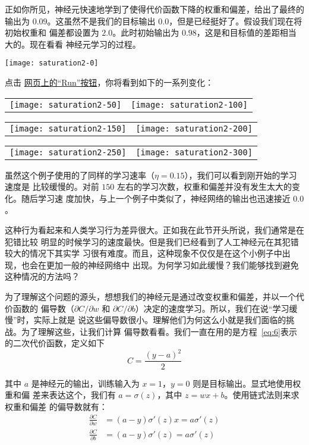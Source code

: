 正如你所见，神经元快速地学到了使得代价函数下降的权重和偏差，给出了最终的输出为
$0.09$。这虽然不是我们的目标输出 $0.0$，但是已经挺好了。假设我们现在将初始权重和
偏差都设置为 $2.0$。此时初始输出为 $0.98$，这是和目标值的差距相当大的。现在看看
神经元学习的过程。
\begin{center}
  \texttt{[image: saturation2-0]}
\end{center}
点击%
\href{http://neuralnetworksanddeeplearning.com/chap3.html#the_cross-entropy_cost_function}{
  网页上的``Run''按钮}，你将看到如下的一系列变化：
  \begin{center}
    \begin{tabular}{ll}
      \texttt{[image: saturation2-50]} & \texttt{[image: saturation2-100]}\\
    \end{tabular}
    \begin{tabular}{ll}
      \texttt{[image: saturation2-150]} & \texttt{[image: saturation2-200]}\\
    \end{tabular}
    \begin{tabular}{ll}
      \texttt{[image: saturation2-250]} & \texttt{[image: saturation2-300]}
    \end{tabular}
  \end{center}

虽然这个例子使用的了同样的学习速率（$\eta=0.15$），我们可以看到刚开始的学习速度是
比较缓慢的。对前 $150$ 左右的学习次数，权重和偏差并没有发生太大的变化。随后学习速
度加快，与上一个例子中类似了，神经网络的输出也迅速接近 $0.0$。

这种行为看起来和人类学习行为差异很大。正如我在此节开头所说，我们通常是在犯错比较
明显的时候学习的速度最快。但是我们已经看到了人工神经元在其犯错较大的情况下其实学
习很有难度。而且，这种现象不仅仅是在这个小例子中出现，也会在更加一般的神经网络中
出现。为何学习如此缓慢？我们能够找到避免这种情况的方法吗？

为了理解这个问题的源头，想想我们的神经元是通过改变权重和偏差，并以一个代价函数的
偏导数（$\partial C/\partial w$ 和
$\partial C/\partial b$）决定的速度学习。所以，我们在说``学习缓慢''时，实际上就是
说这些偏导数很小。理解他们为何这么小就是我们面临的挑战。为了理解这些，让我们计算
偏导数看看。我们一直在用的是方程~\eqref{eq:6}表示的二次代价函数，定义如下
\begin{equation}
  C = \frac{(y-a)^2}{2}
\label{eq:54}\tag{54}
\end{equation}

其中 $a$ 是神经元的输出，训练输入为 $x=1$，$y=0$ 则是目标输出。显式地使用权重和偏
差来表达这个，我们有 $a = \sigma(z)$，其中 $z = wx+b$。使用链式法则来求权重和偏差
的偏导数就有：
\begin{align}
  \frac{\partial C}{\partial w} &= (a-y)\sigma'(z) x = a \sigma'(z)\label{eq:55}\tag{55}\\
  \frac{\partial C}{\partial b} &= (a-y)\sigma'(z) = a \sigma'(z)\label{eq:56}\tag{56}
\end{align}

